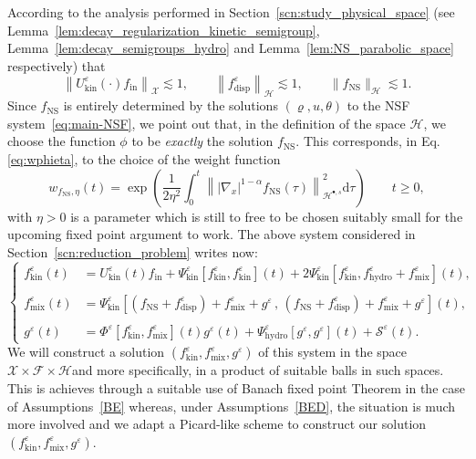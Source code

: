 \documentclass[AHL,Unicode,longabstracts,published]{cedram}
\newcommand{\ini}{\mathrm{in}}
\newcommand{\ns}{\mathrm{NS}}
\newcommand{\hyd}{\mathrm{hydro}}
\newcommand{\mix}{\mathrm{mix}}
\newcommand{\kin}{\mathrm{kin}}
\renewcommand{\d}{\mathrm{d}}
\newcommand{\disp}{\mathrm{disp}}
\newcommand{\HH}{\mathcal{H}}
\renewcommand{\SS}{\mathcal{S}}
\newcommand{\FFF}{\mathscr{F}}
\newcommand{\HHH}{\mathscr{H}}
\newcommand{\GGG}{\mathscr{X}}
\newcommand{\rSSsp}[1]{\HH^{{\bullet}, #1}}
\newcommand{\SSSs}{\HHH}
\newcommand{\SSSl}{\GGG}
\newcommand{\SSSm}{\FFF}
\renewcommand*\ge{\geqslant}
\newcommand*\eps{{\varepsilon}}
\begin{document}
According to the analysis performed in Section~\ref{scn:study_physical_space} (see Lemma~\ref{lem:decay_regularization_kinetic_semigroup}, Lemma~\ref{lem:decay_semigroups_hydro} and Lemma~\ref{lem:NS_parabolic_space} respectively) that
\[
\left\| U^\eps_\kin(\cdot) f_\ini \right\|_{\SSSl} \lesssim 1, \qquad \left\| f^\eps_\disp \right\|_{\SSSs} \lesssim 1, \qquad \| f_\ns \|_{\SSSs} \lesssim 1.
\]
Since $f_\ns$ is entirely determined by the solutions $(\varrho,u,\theta)$ to the NSF system~\eqref{eq:main-NSF}, we point out that, in the definition of the space $\SSSs$, we choose the function $\phi$ to be \emph{exactly} the solution $f_\ns$. This corresponds, in Eq. \eqref{eq:wphieta}, to the choice of the weight function
\[
w_{f_\ns,\eta}(t)=\exp\left(\frac{1}{2 \eta^2} \int_0^t \left\| |\nabla_x|^{1-\alpha} f_\ns(\tau) \right\|_{\rSSsp{s}}^2 \d \tau \right) \qquad t \ge0,
\]
with $\eta >0$ is a parameter which is still to free to be chosen {suitably small for the upcoming fixed point argument to work}. The above system considered in Section~\ref{scn:reduction_problem} writes now:
\begin{equation}\label{eq:systemKinMixG}
\begin{cases}
f^\eps_\kin(t) &= U^\eps_\kin(t) f_\ini + \Psi^\eps_\kin \left[f^\eps_\kin, f^\eps_\kin \right](t) + 2 \Psi^\eps_\kin\left[f^\eps_\kin, f^\eps_\hyd + f^\eps_\mix\right](t),\\
\\
f^\eps_\mix(t) &=\Psi^\eps_\kin\left[\left(f_\ns + f^\eps_\disp\right)+ f_\mix^\eps+g^\eps\,, \,\left(f_\ns + f^\eps_\disp\right)+ f_\mix^\eps+g^\eps \right](t),\\
\\
g^\eps(t) &= \Phi^\eps\left[f^\eps_\kin, f^\eps_\mix\right](t) g^\eps(t)+
\Psi^\eps_\hyd\left[g^\eps, g^\eps\right](t) + \SS^\eps(t).
\end{cases}
\end{equation}
We will construct a solution $(f^\eps_\kin, f^\eps_\mix, g^\eps)$ of this system in the space $ \SSSl \times \SSSm \times \SSSs $and more specifically, in a product of suitable balls in such spaces. This is achieves through a suitable use of Banach fixed point Theorem in the case of Assumptions~\eqref{BE} whereas, under Assumptions~\eqref{BED}, the situation is much more involved and we adapt a Picard-like scheme to construct our solution $(f^\eps_\kin,f^\eps_\mix,g^\eps)$. 
\end{document}
